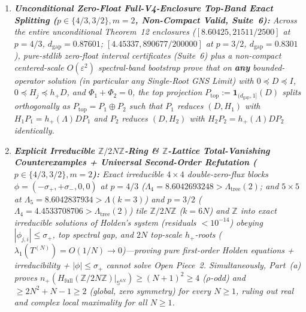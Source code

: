 \documentclass[10pt,letterpaper]{article}
\newcommand{\rank}{\operatorname{rank}}
\begin{document}
\begin{tcolorbox}[mathbox]
\begin{enumerate}[label=(\alph*),leftmargin=1.8em,itemsep=2pt,topsep=2pt]
  \begin{equation}\label{eq:euler_betti}
    (R - 1) + \beta_1(G) = Z + \sum_{j=1}^2 \sum_{B \in \mathcal{B}_j \setminus \mathcal{Q}_j^+} \bigl(\rank(P_B^-) - 1\bigr),
  \end{equation}
  \emph{with every right-hand summand $\ge 0$ (where $R = |\mathcal{Q}_1^+| + |\mathcal{Q}_2^+|$ counts $1\times 1$ $h_+$-roots and $Z = \rank(\ker\Phi_1)$). Hence single-root tree topology ($R = 1, \beta_1 = 0$) holds iff $Z = 0$ and $\rank(P_B^-) = 1$ on every non-$\mathcal{Q}_j^+$ block.}
  \item \emph{\textbf{Unconditional Zero-Float Full-V4-Enclosure Top-Band Exact Splitting ($p \in \{4/3, 3/2\}, m = 2$, Non-Compact Valid, Suite~6):} Across the entire unconditional Theorem~12 enclosures ($[8.60425, 21511/2500]$ at $p=4/3$, $d_{\mathrm{gap}} = 0.87601$; $[4.45337, 890677/200000]$ at $p=3/2$, $d_{\mathrm{gap}} = 0.8301$), pure-stdlib zero-float interval certificates (Suite~6) plus a non-compact centered-scale $O(\varepsilon^2)$ spectral-band bootstrap prove that on \textbf{any} bounded-operator solution (in particular any Single-Root GNS Limit) with $0 \preceq D \preceq I$, $0 \preceq H_j \preceq h_+ D$, and $\Phi_1 + \Phi_2 = 0$, the top projection $P_{\mathrm{top}} := \mathbf{1}_{(d_{\mathrm{gap}}, 1]}(D)$ splits orthogonally as $P_{\mathrm{top}} = P_1 \oplus P_2$ such that $P_1$ reduces $(D, H_1)$ with $H_1 P_1 = h_+(\Lambda) D P_1$ and $P_2$ reduces $(D, H_2)$ with $H_2 P_2 = h_+(\Lambda) D P_2$ identically.}
  \item \emph{\textbf{Explicit Irreducible $\mathbb{Z}/2N\mathbb{Z}$-Ring \& $\mathbb{Z}$-Lattice Total-Vanishing Counterexamples + Universal Second-Order Refutation ($p \in \{4/3, 3/2\}, m = 2$):} Exact irreducible $4\times 4$ double-zero-flux blocks $\phi = (-\sigma_+, +\sigma_-, 0, 0)$ at $p = 4/3$ ($\Lambda_4 = 8.6042693248 > \Lambda_{\mathrm{tree}}(2)$; and $5\times 5$ at $\Lambda_5 = 8.6042837934 > \Lambda(k=3)$) and $p = 3/2$ ($\Lambda_4 = 4.4533708706 > \Lambda_{\mathrm{tree}}(2)$) tile $\mathbb{Z}/2N\mathbb{Z}$ ($k = 6N$) and $\mathbb{Z}$ into exact irreducible solutions of Holden's system (residuals $< 10^{-14}$) obeying $|\phi_{j,i}| \le \sigma_+$, top spectral gap, and $2N$ top-scale $h_+$-roots ($\lambda_1(T^{(N)}) = O(1/N) \to 0$)—proving pure first-order Holden equations + irreducibility + $|\phi| \le \sigma_+$ cannot solve Open Piece~2. Simultaneously, Part~(a) proves $n_+(H_{\mathrm{full}}(\mathbb{Z}/2N\mathbb{Z})|_{\mathbb{S}^{6N}}) \ge (N+1)^2 \ge 4$ ($\rho$-odd) and $\ge 2N^2 + N - 1 \ge 2$ (global, zero symmetry) for every $N \ge 1$, ruling out real and complex local maximality for all $N \ge 1$.}
\end{enumerate}
\end{tcolorbox}
\end{document}
